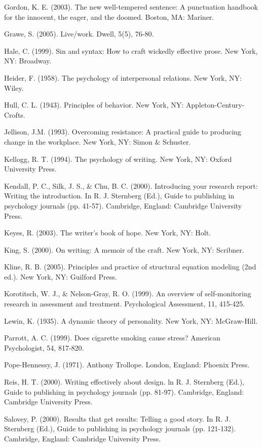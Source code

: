\documentclass[lang=cn,newtx,14pt,scheme=chinese]{elegantbook}
\begin{document}
Gordon, K. E. (2003). The new well-tempered sentence: A punctuation handbook for the innocent, the eager, and the doomed. Boston, MA: Mariner.

Grawe, S. (2005). Live/work. Dwell, 5(5), 76-80.

Hale, C. (1999). Sin and syntax: How to craft wickedly effective prose. New York, NY: Broadway.

Heider, F. (1958). The psychology of interpersonal relations. New York, NY: Wiley.

Hull, C. L. (1943). Principles of behavior. New York, NY: Appleton-Century-Crofts.

Jellison, J.M. (1993). Overcoming resistance: A practical guide to producing change in the workplace. New York, NY: Simon \& Schuster.

Kellogg, R. T. (1994). The psychology of writing. New York, NY: Oxford University Press.

Kendall, P. C., Silk, J. S., \& Chu, B. C. (2000). Introducing your research report: Writing the introduction. In R. J. Sternberg (Ed.), Guide to publishing in psychology journals (pp. 41-57). Cambridge, England: Cambridge University Press.

Keyes, R. (2003). The writer's book of hope. New York, NY: Holt.

King, S. (2000). On writing: A memoir of the craft. New York, NY: Scribner.

Kline, R. B. (2005). Principles and practice of structural equation modeling (2nd ed.). New York, NY: Guilford Press.

Korotitsch, W. J., \& Nelson-Gray, R. O. (1999). An overview of self-monitoring research in assessment and treatment. Psychological Assessment, 11, 415-425.

Lewin, K. (1935). A dynamic theory of personality. New York, NY: McGraw-Hill.

Parrott, A. C. (1999). Does cigarette smoking cause stress? American Psychologist, 54, 817-820.

Pope-Hennessy, J. (1971). Anthony Trollope. London, England: Phoenix Press.

Reis, H. T. (2000). Writing effectively about design. ln R. J. Sternberg (Ed.), Guide to publishing in psychology journals (pp. 81-97). Cambridge, England: Cambridge University Press.

Salovey, P. (2000). Results that get results: Telling a good story. In R. J. Sternberg (Ed.), Guide to publishing in psychology journals (pp. 121-132). Cambridge, England: Cambridge University Press.
\end{document}
